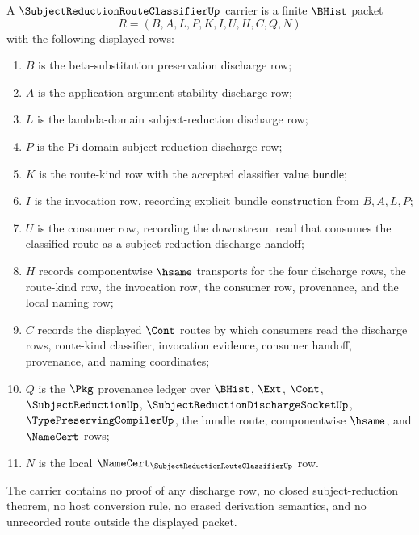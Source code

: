 \begin{definition}
\label{def:subject-reduction-route-classifier-carrier}
A $\SubjectReductionRouteClassifierUp$ carrier is a finite $\BHist$ packet
$$
R=(B,A,L,P,K,I,U,H,C,Q,N)
$$
with the following displayed rows:
\begin{enumerate}
\item $B$ is the beta-substitution preservation discharge row;
\item $A$ is the application-argument stability discharge row;
\item $L$ is the lambda-domain subject-reduction discharge row;
\item $P$ is the Pi-domain subject-reduction discharge row;
\item $K$ is the route-kind row with the accepted classifier value $\mathsf{bundle}$;
\item $I$ is the invocation row, recording explicit bundle construction from $B,A,L,P$;
\item $U$ is the consumer row, recording the downstream read that consumes the classified route as a subject-reduction discharge handoff;
\item $H$ records componentwise $\hsame$ transports for the four discharge rows, the route-kind row, the invocation row, the consumer row, provenance, and the local naming row;
\item $C$ records the displayed $\Cont$ routes by which consumers read the discharge rows, route-kind classifier, invocation evidence, consumer handoff, provenance, and naming coordinates;
\item $Q$ is the $\Pkg$ provenance ledger over $\BHist$, $\Ext$, $\Cont$, $\SubjectReductionUp$, $\SubjectReductionDischargeSocketUp$, $\TypePreservingCompilerUp$, the bundle route, componentwise $\hsame$, and $\NameCert$ rows;
\item $N$ is the local $\NameCert_{\SubjectReductionRouteClassifierUp}$ row.
\end{enumerate}
The carrier contains no proof of any discharge row, no closed subject-reduction theorem, no host conversion rule, no erased derivation semantics, and no unrecorded route outside the displayed packet.
\end{definition}

